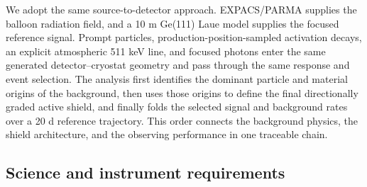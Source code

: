 \documentclass[11pt]{article}
\begin{document}
We adopt the same source-to-detector approach. EXPACS/PARMA supplies the
balloon radiation field, and a 10 m Ge(111) Laue model supplies the focused
reference signal. Prompt particles, production-position-sampled activation
decays, an explicit atmospheric 511 keV line, and focused photons enter the
same generated detector--cryostat geometry and pass through the same response
and event selection. The analysis first identifies the dominant particle and
material origins of the background, then uses those origins to define the
final directionally graded active shield, and finally folds the selected signal
and background rates over a 20 d reference trajectory. This order connects the
background physics, the shield architecture, and the observing performance in
one traceable chain.

\subsection{Science and instrument requirements}
\label{sec:requirements}
\end{document}
